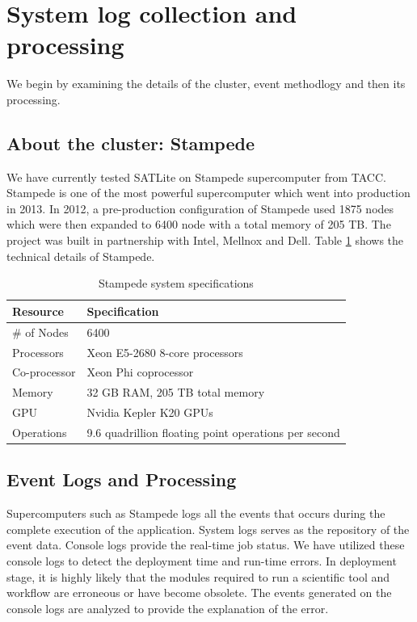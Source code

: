 \documentclass[10pt]{ruthesis}
\begin{document}
\section{System log collection and processing}
We begin by examining the details of the cluster, event methodlogy and then its processing.

\subsection{About the cluster: Stampede}
We have currently tested SATLite on Stampede supercomputer from TACC. Stampede is one of the most powerful supercomputer which went into production in 2013. In 2012, a pre-production configuration of Stampede used 1875 nodes which were then expanded to 6400 node with a total memory of 205 TB. The project was built in partnership with Intel, Mellnox and Dell. Table \ref{stampedespec} shows the technical details of Stampede.

\begin{table}
\begin{center}
\def\arraystretch{1.5}
\begin{tabular}{|p{3cm}|p{10cm}|}
\hline
\rule{0pt}{15pt} \textbf{Resource} & \textbf{Specification} \\[2ex]
\hline
\# of Nodes & 6400
\\
\hline
Processors & Xeon E5-2680 8-core processors
\\
\hline
Co-processor & Xeon Phi coprocessor
\\
\hline
Memory & 32 GB RAM, 205 TB total memory
\\
\hline
GPU & Nvidia Kepler K20 GPUs
\\
\hline
Operations & 9.6 quadrillion floating point operations per second
\\
\hline
\end{tabular}
\end{center}
\caption{Stampede system specifications}
\label{stampedespec}
\end{table}

\subsection{Event Logs and Processing}
Supercomputers such as Stampede logs all the events that occurs during the complete execution of the application. System logs serves as the repository of the event data. Console logs provide the real-time job status. We have utilized these console logs to detect the deployment time and run-time errors. In deployment stage, it is highly likely that the modules required to run a scientific tool and workflow are erroneous or have become obsolete. The events generated on the console logs are analyzed to provide the explanation of the error.
\end{document}
